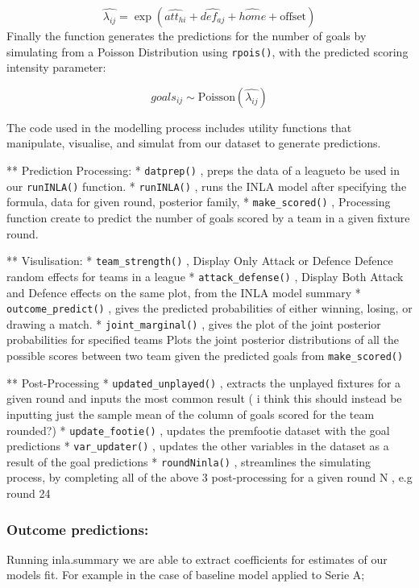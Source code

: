 \documentclass[
]{article}
\begin{document}
\[\hat{\lambda_{ij}} = \exp(\hat{att_{hi}} + \hat{def_{aj}} + \hat{home} + \text{offset})\]
Finally the function generates the predictions for the number of goals
by simulating from a Poisson Distribution using \texttt{rpois()}, with
the predicted scoring intensity parameter:

\[goals_{ij} \sim  \text{Poisson} ( \hat{\lambda_{ij}} )\]

The code used in the modelling process includes utility functions that
manipulate, visualise, and simulat from our dataset to generate
predictions.

** Prediction Processing: * \texttt{datprep()} , preps the data of a
leagueto be used in our \texttt{runINLA()} function. *
\texttt{runINLA()} , runs the INLA model after specifying the formula,
data for given round, posterior family, * \texttt{make\_scored()} ,
Processing function create to predict the number of goals scored by a
team in a given fixture round.

** Visulisation: * \texttt{team\_strength()} , Display Only Attack or
Defence Defence random effects for teams in a league *
\texttt{attack\_defense()} , Display Both Attack and Defence effects on
the same plot, from the INLA model summary * \texttt{outcome\_predict()}
, gives the predicted probabilities of either winning, losing, or
drawing a match. * \texttt{joint\_marginal()} , gives the plot of the
joint posterior probabilities for specified teams Plots the joint
posterior distributions of all the possible scores between two team
given the predicted goals from \texttt{make\_scored()}

** Post-Processing * \texttt{updated\_unplayed()} , extracts the
unplayed fixtures for a given round and inputs the most common result (
i think this should instead be inputting just the sample mean of the
column of goals scored for the team rounded?) *
\texttt{update\_footie()} , updates the premfootie dataset with the goal
predictions * \texttt{var\_updater()} , updates the other variables in
the dataset as a result of the goal predictions * \texttt{roundNinla()}
, streamlines the simulating process, by completing all of the above 3
post-processing for a given round N , e.g round 24

\hypertarget{outcome-predictions}{%
\subsubsection{Outcome predictions:}\label{outcome-predictions}}

Running inla.summary we are able to extract coefficients for estimates
of our models fit. For example in the case of baseline model applied to
Serie A;
\end{document}
